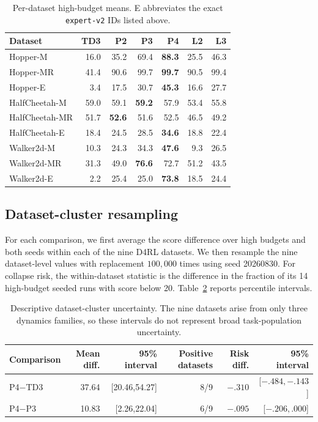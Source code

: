 \documentclass[letterpaper]{article}
\begin{document}
\begin{table}[h]
\caption{Per-dataset high-budget means. E abbreviates the exact \texttt{expert-v2} IDs listed above.}
\centering
\small
\setlength{\tabcolsep}{3.5pt}
\begin{tabular}{lrrrrrr}
\toprule
Dataset&TD3&P2&P3&P4&L2&L3\\
\midrule
Hopper-M&16.0&35.2&69.4&\textbf{88.3}&25.5&46.3\\
Hopper-MR&41.4&90.6&99.7&\textbf{99.7}&90.5&99.4\\
Hopper-E&3.4&17.5&30.7&\textbf{45.3}&16.6&27.7\\
HalfCheetah-M&59.0&59.1&\textbf{59.2}&57.9&53.4&55.8\\
HalfCheetah-MR&51.7&\textbf{52.6}&51.6&52.5&46.5&49.2\\
HalfCheetah-E&18.4&24.5&28.5&\textbf{34.6}&18.8&22.4\\
Walker2d-M&10.3&24.3&34.3&\textbf{47.6}&9.3&26.5\\
Walker2d-MR&31.3&49.0&\textbf{76.6}&72.7&51.2&43.5\\
Walker2d-E&2.2&25.4&25.0&\textbf{73.8}&18.5&24.4\\
\bottomrule
\end{tabular}
\label{tab:env_means}
\end{table}

\subsection{Dataset-cluster resampling}
For each comparison, we first average the score difference over high budgets and both seeds within each of the nine D4RL datasets. We then resample the nine dataset-level values with replacement $100{,}000$ times using seed 20260830. For collapse risk, the within-dataset statistic is the difference in the fraction of its 14 high-budget seeded runs with score below 20. Table~\ref{tab:task_bootstrap} reports percentile intervals.

\begin{table}[h]
\caption{Descriptive dataset-cluster uncertainty. The nine datasets arise from only three dynamics families, so these intervals do not represent broad task-population uncertainty.}
\centering
\small
\begin{tabular}{lrrr@{\qquad}rr}
\toprule
Comparison&Mean diff.&95\% interval&Positive datasets&Risk diff.&95\% interval\\
\midrule
P4$-$TD3&37.64&[20.46,54.27]&8/9&$-.310$&[$-.484,-.143$]\\
P4$-$P3&10.83&[2.26,22.04]&6/9&$-.095$&[$-.206,.000$]\\
\bottomrule
\end{tabular}
\label{tab:task_bootstrap}
\end{table}
\end{document}
